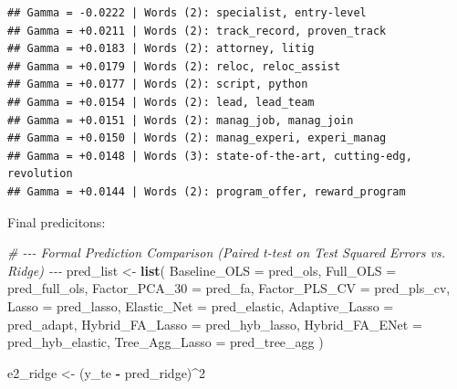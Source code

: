 \documentclass[
]{article}
\newenvironment{Shaded}{\begin{snugshade}}{\end{snugshade}}
\newcommand{\AttributeTok}[1]{\textcolor[rgb]{0.13,0.29,0.53}{#1}}
\newcommand{\CommentTok}[1]{\textcolor[rgb]{0.56,0.35,0.01}{\textit{#1}}}
\newcommand{\DecValTok}[1]{\textcolor[rgb]{0.00,0.00,0.81}{#1}}
\newcommand{\FunctionTok}[1]{\textcolor[rgb]{0.13,0.29,0.53}{\textbf{#1}}}
\newcommand{\NormalTok}[1]{#1}
\newcommand{\OtherTok}[1]{\textcolor[rgb]{0.56,0.35,0.01}{#1}}
\newcommand{\SpecialCharTok}[1]{\textcolor[rgb]{0.81,0.36,0.00}{\textbf{#1}}}
\begin{document}
\begin{verbatim}
## Gamma = -0.0222 | Words (2): specialist, entry-level
## Gamma = +0.0211 | Words (2): track_record, proven_track
## Gamma = +0.0183 | Words (2): attorney, litig
## Gamma = +0.0179 | Words (2): reloc, reloc_assist
## Gamma = +0.0177 | Words (2): script, python
## Gamma = +0.0154 | Words (2): lead, lead_team
## Gamma = +0.0151 | Words (2): manag_job, manag_join
## Gamma = +0.0150 | Words (2): manag_experi, experi_manag
## Gamma = +0.0148 | Words (3): state-of-the-art, cutting-edg, revolution
## Gamma = +0.0144 | Words (2): program_offer, reward_program
\end{verbatim}

Final predicitons:

\begin{Shaded}
\begin{Highlighting}[]
\CommentTok{\# {-}{-}{-} Formal Prediction Comparison (Paired t{-}test on Test Squared Errors vs. Ridge) {-}{-}{-}}
\NormalTok{pred\_list }\OtherTok{\textless{}{-}} \FunctionTok{list}\NormalTok{(}
  \AttributeTok{Baseline\_OLS    =}\NormalTok{ pred\_ols,}
  \AttributeTok{Full\_OLS        =}\NormalTok{ pred\_full\_ols,}
  \AttributeTok{Factor\_PCA\_30   =}\NormalTok{ pred\_fa,}
  \AttributeTok{Factor\_PLS\_CV   =}\NormalTok{ pred\_pls\_cv,}
  \AttributeTok{Lasso           =}\NormalTok{ pred\_lasso,}
  \AttributeTok{Elastic\_Net     =}\NormalTok{ pred\_elastic,}
  \AttributeTok{Adaptive\_Lasso  =}\NormalTok{ pred\_adapt,}
  \AttributeTok{Hybrid\_FA\_Lasso =}\NormalTok{ pred\_hyb\_lasso,}
  \AttributeTok{Hybrid\_FA\_ENet  =}\NormalTok{ pred\_hyb\_elastic,}
  \AttributeTok{Tree\_Agg\_Lasso  =}\NormalTok{ pred\_tree\_agg}
\NormalTok{)}

\NormalTok{e2\_ridge }\OtherTok{\textless{}{-}}\NormalTok{ (y\_te }\SpecialCharTok{{-}}\NormalTok{ pred\_ridge)}\SpecialCharTok{\^{}}\DecValTok{2}


\end{Highlighting}
\end{Shaded}
\end{document}
